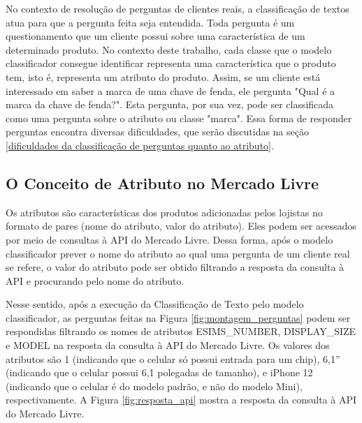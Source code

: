No contexto de resolução de perguntas de clientes reais, a classificação de textos atua para que a pergunta feita seja entendida. Toda pergunta é um questionamento que um cliente possui sobre uma característica de um determinado produto. No contexto deste trabalho, cada classe que o modelo classificador consegue identificar representa uma característica que o produto tem, isto é, representa um atributo do produto. Assim, se um cliente está interessado em saber a marca de uma chave de fenda, ele pergunta "Qual é a marca da chave de fenda?". Esta pergunta, por sua vez, pode ser classificada como uma pergunta sobre o atributo ou classe "marca". Essa forma de responder perguntas encontra diversas dificuldades, que serão discutidas na seção \ref{dificuldades da classificação de perguntas quanto ao atributo}.

\subsection{O Conceito de Atributo no Mercado Livre}
\label{o conceito de atributo no mercado livre}
Os atributos são características dos produtos adicionadas pelos lojistas no formato de pares (nome do atributo, valor do atributo). Eles podem ser acessados por meio de consultas à API do Mercado Livre. Dessa forma, após o modelo classificador prever o nome do atributo ao qual uma pergunta de um cliente real se refere, o valor do atributo pode ser obtido filtrando a resposta da consulta à API e procurando pelo nome do atributo.

Nesse sentido, após a execução da Classificação de Texto pelo modelo classificador, as perguntas feitas na Figura \ref{fig:montagem_perguntas} podem ser respondidas filtrando os nomes de atributos ESIMS\_NUMBER, DISPLAY\_SIZE e MODEL na resposta da consulta à API do Mercado Livre. Os valores dos atributos são 1 (indicando que o celular só possui entrada para um chip), 6,1'' (indicando que o celular possui 6,1 polegadas de tamanho), e iPhone 12 (indicando que o celular é do modelo padrão, e não do modelo Mini), respectivamente. A Figura \ref{fig:resposta_api} mostra a resposta da consulta à API do Mercado Livre.

